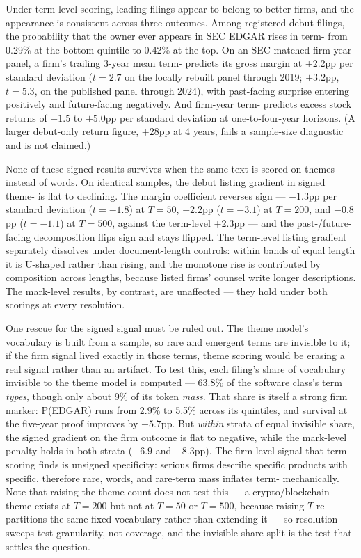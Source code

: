 \label{sec:robust_hazard}

Under term-level scoring, leading filings appear to belong to better
firms, and the appearance is consistent across three outcomes. Among
registered debut filings, the probability that the owner ever appears in
SEC EDGAR rises in term-\dkl{} from 0.29\% at the bottom quintile to
0.42\% at the top. On an SEC-matched firm-year panel, a firm's trailing
3-year mean term-\dkl{} predicts its gross margin at $+2.2$pp per
standard deviation ($t = 2.7$ on the locally rebuilt panel through 2019;
$+3.2$pp, $t = 5.3$, on the published panel through 2024), with
past-facing surprise entering positively and future-facing negatively.
And firm-year term-\dkl{} predicts excess stock returns of $+1.5$ to
$+5.0$pp per standard deviation at one-to-four-year horizons. (A larger
debut-only return figure, $+28$pp at 4 years, fails a sample-size
diagnostic and is not claimed.)

None of these signed results survives when the same text is scored on
themes instead of words. On identical samples, the debut listing
gradient in signed theme-\dkl{} is flat to declining. The margin
coefficient reverses sign --- $-1.3$pp per standard deviation
($t = -1.8$) at $T = 50$, $-2.2$pp ($t = -3.1$) at $T = 200$, and
$-0.8$pp ($t = -1.1$) at $T = 500$, against the term-level $+2.3$pp ---
and the past-/future-facing decomposition flips sign and stays flipped.
The term-level listing gradient separately dissolves under
document-length controls: within bands of equal length it is U-shaped
rather than rising, and the monotone rise is contributed by composition
across lengths, because listed firms' counsel write longer descriptions.
The mark-level results, by contrast, are unaffected --- they hold under
both scorings at every resolution.

One rescue for the signed signal must be ruled out. The theme model's
vocabulary is built from a sample, so rare and emergent terms are
invisible to it; if the firm signal lived exactly in those terms, theme
scoring would be erasing a real signal rather than an artifact. To test
this, each filing's share of vocabulary invisible to the theme model is
computed --- 63.8\% of the software class's term \emph{types}, though
only about 9\% of its token \emph{mass}. That share is itself a strong
firm marker: P(EDGAR) runs from 2.9\% to 5.5\% across its quintiles, and
survival at the five-year proof improves by $+5.7$pp. But \emph{within}
strata of equal invisible share, the signed \dkl{} gradient on the firm
outcome is flat to negative, while the mark-level penalty holds in both
strata ($-6.9$ and $-8.3$pp). The firm-level signal that term scoring
finds is unsigned specificity: serious firms describe specific products
with specific, therefore rare, words, and rare-term mass inflates
term-\dkl{} mechanically. Note that raising the theme count does not
test this --- a crypto/blockchain theme exists at $T = 200$ but not at
$T = 50$ or $T = 500$, because raising $T$ re-partitions the same fixed
vocabulary rather than extending it --- so resolution sweeps test
granularity, not coverage, and the invisible-share split is the test
that settles the question.


